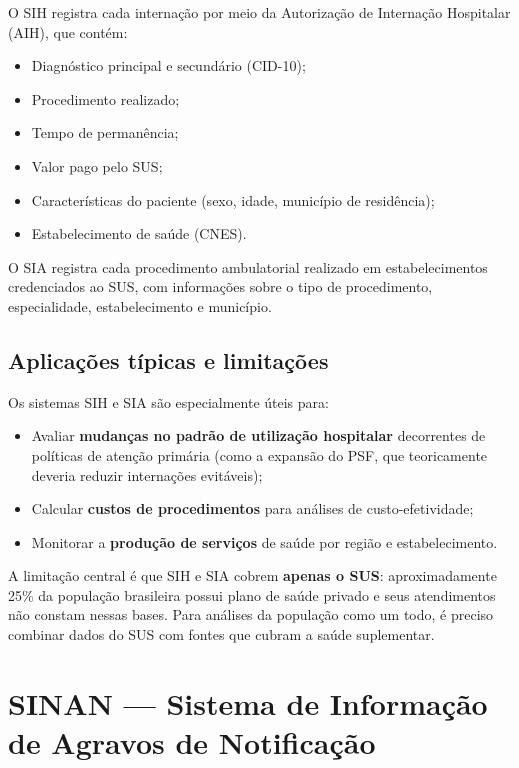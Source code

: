 O SIH registra cada internação por meio da Autorização de Internação Hospitalar (AIH), que contém:
\begin{itemize}
  \item Diagnóstico principal e secundário (CID-10);
  \item Procedimento realizado;
  \item Tempo de permanência;
  \item Valor pago pelo SUS;
  \item Características do paciente (sexo, idade, município de residência);
  \item Estabelecimento de saúde (CNES).
\end{itemize}

O SIA registra cada procedimento ambulatorial realizado em estabelecimentos credenciados ao SUS, com informações sobre o tipo de procedimento, especialidade, estabelecimento e município.

\subsection{Aplicações típicas e limitações}

Os sistemas SIH e SIA são especialmente úteis para:
\begin{itemize}
  \item Avaliar \textbf{mudanças no padrão de utilização hospitalar} decorrentes de políticas de atenção primária (como a expansão do PSF, que teoricamente deveria reduzir internações evitáveis);
  \item Calcular \textbf{custos de procedimentos} para análises de custo-efetividade;
  \item Monitorar a \textbf{produção de serviços} de saúde por região e estabelecimento.
\end{itemize}

A limitação central é que SIH e SIA cobrem \textbf{apenas o SUS}: aproximadamente 25\% da população brasileira possui plano de saúde privado e seus atendimentos não constam nessas bases. Para análises da população como um todo, é preciso combinar dados do SUS com fontes que cubram a saúde suplementar.

\section{SINAN --- Sistema de Informação de Agravos de Notificação}

